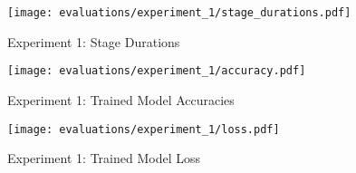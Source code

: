 \begin{figure}[H]
    \begin{adjustwidth}{-0.2\paperwidth}{-0.2\paperwidth}
        \centering
        \texttt{[image: evaluations/experiment\_1/stage\_durations.pdf]}
        \caption{Experiment 1: Stage Durations}
        \label{fig:eval_1_simplest_stage_durations}
    \end{adjustwidth}
\end{figure}

\begin{figure}[H]
    \centering
    \texttt{[image: evaluations/experiment\_1/accuracy.pdf]}
    \caption{Experiment 1: Trained Model Accuracies}
    \label{fig:eval_1_simplest_accuracies}
\end{figure}

\begin{figure}[H]
    \centering
    \texttt{[image: evaluations/experiment\_1/loss.pdf]}
    \caption{Experiment 1: Trained Model Loss}
    \label{fig:eval_1_simplest_loss}
\end{figure}

